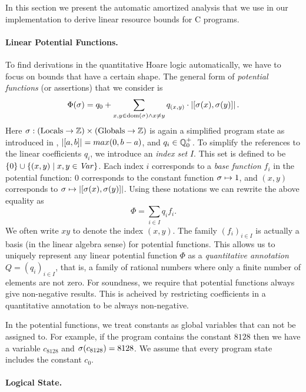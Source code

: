 \documentclass[nocopyrightspace,preprint]{sigplanconf}
\newcommand{\pref}[1]{\prettyref{#1}}
\begin{document}
In this section we present the automatic amortized analysis that we
use in our implementation to derive linear resource bounds for C
programs.

\paragraph{Linear Potential Functions.}

To find derivations in the quantitative Hoare logic automatically, we
have to focus on bounds that have a certain shape.  The general form
of \emph{potential functions} (or assertions) that we consider is
$$
  \Phi(\sigma) = q_0 + \sum_{x, y \in  \text{dom}(\sigma) \land x \neq y}
    q_{(x, y)} \cdot |[\sigma(x),\sigma(y)]| \, .
$$
%
Here $\sigma : (\text{Locals} \to \mathbb{Z}) \times (\text{Globals} \to \mathbb{Z})$
is again a simplified program state as introduced in \pref{sec:sem},
$|[a,b]| = max(0,b-a)$, and $q_i \in \mathbb Q^+_0$.  To simplify the
references to the linear coefficients $q_i$, we introduce an \emph{index
  set} $I$.  This set is defined to be $\{0\} \cup \{(x, y) \mid x, y
\in \mathit{Var} \}$.  Each index $i$ corresponds to a \emph{base function}
$f_i$ in the potential function: $0$ corresponds to the constant
function $\sigma \mapsto 1$, and $(x,y)$ corresponds to $\sigma \mapsto
|[\sigma(x),\sigma(y)]|$.  Using these notations we can
rewrite the above equality as
$$
  \Phi = \sum_{i \in I} q_i f_i.
$$
We often write $xy$ to denote the index $(x,y)$.  The family
$(f_i)_{i\in I}$ is actually a basis (in the linear algebra sense) for
potential functions.  This allows us to uniquely represent any linear
potential function $\Phi$ as a \emph{quantitative annotation} $Q =
(q_i)_{i \in I}$, that is, a family of rational numbers where only a
finite number of elements are not zero.
%
For soundness, we require that potential functions always give
non-negative results.  This is acheived by restricting coefficients
in a quantitative annotation to be always non-negative.

In the potential functions, we treat constants as global variables
that can not be assigned to.  For example, if the program contains the
constant $8128$ then we have a variable $c_{8128}$ and
$\sigma(c_{8128}) = 8128$.  We assume that every program state
includes the constant $c_0$.

\paragraph{Logical State.}
\end{document}
